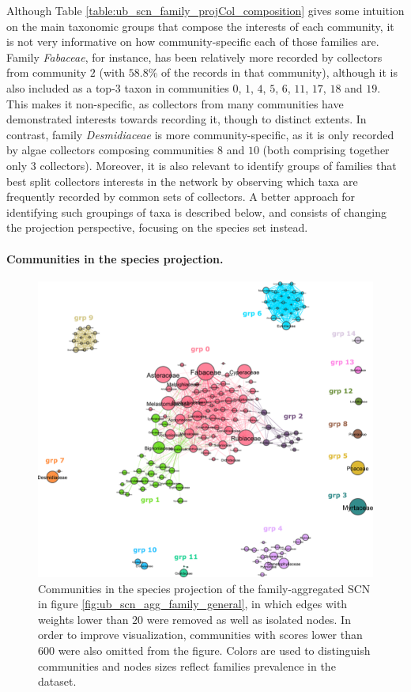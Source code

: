 Although Table \ref{table:ub_scn_family_projCol_composition} gives some intuition on the main taxonomic groups that compose the interests of each community, it is not very informative on how community-specific each of those families are.
Family \textit{Fabaceae}, for instance, has been relatively more recorded by collectors from community $2$ (with $58.8\%$ of the records in that community), although it is also included as a top-3 taxon in communities $0$, $1$, $4$, $5$, $6$, $11$, $17$, $18$ and $19$.
This makes it non-specific, as collectors from many communities have demonstrated interests towards recording it, though to distinct extents.
In contrast, family \textit{Desmidiaceae} is more community-specific, as it is only recorded by algae collectors composing communities $8$ and $10$ (both comprising together only $3$ collectors).
Moreover, it is also relevant to identify groups of families that best split collectors interests in the network by observing which taxa are frequently recorded by common sets of collectors.
A better approach for identifying such groupings of taxa is described below, and consists of changing the projection perspective, focusing on the species set instead.

\paragraph{Communities in the species projection.}
\begin{figure}[!ht]
  	\centering
    \includegraphics[width=\linewidth]{figures/casestudy_ub/scn_family_projSp_communities.pdf}
    \caption[Communities in the species projection of the family-aggregated SCN.]{ Communities in the species projection of the family-aggregated SCN in figure \ref{fig:ub_scn_agg_family_general}, in which edges with weights lower than $20$ were removed as well as isolated nodes. In order to improve visualization, communities with scores lower than $600$ were also omitted from the figure. Colors are used to distinguish communities and nodes sizes reflect families prevalence in the dataset.}
    \label{fig:ub_scn_family_projSp_communities}
\end{figure}

